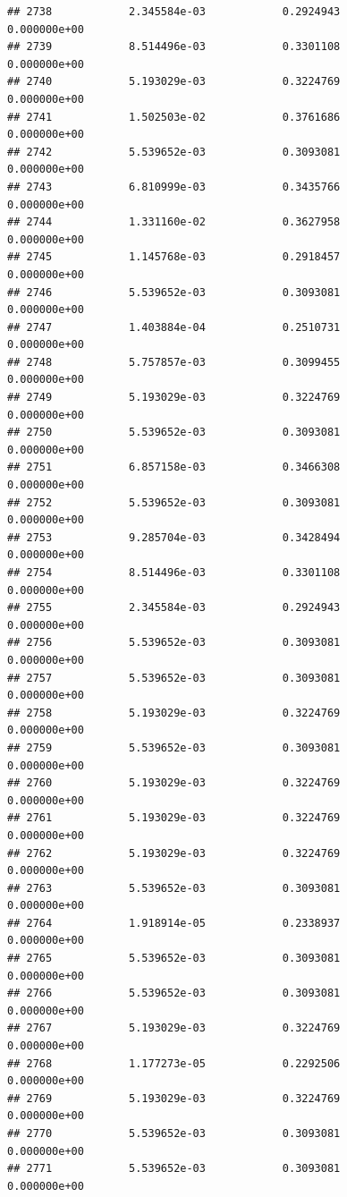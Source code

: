 \documentclass[
]{article}
\begin{document}
\begin{verbatim}
## 2738            2.345584e-03            0.2924943            0.000000e+00
## 2739            8.514496e-03            0.3301108            0.000000e+00
## 2740            5.193029e-03            0.3224769            0.000000e+00
## 2741            1.502503e-02            0.3761686            0.000000e+00
## 2742            5.539652e-03            0.3093081            0.000000e+00
## 2743            6.810999e-03            0.3435766            0.000000e+00
## 2744            1.331160e-02            0.3627958            0.000000e+00
## 2745            1.145768e-03            0.2918457            0.000000e+00
## 2746            5.539652e-03            0.3093081            0.000000e+00
## 2747            1.403884e-04            0.2510731            0.000000e+00
## 2748            5.757857e-03            0.3099455            0.000000e+00
## 2749            5.193029e-03            0.3224769            0.000000e+00
## 2750            5.539652e-03            0.3093081            0.000000e+00
## 2751            6.857158e-03            0.3466308            0.000000e+00
## 2752            5.539652e-03            0.3093081            0.000000e+00
## 2753            9.285704e-03            0.3428494            0.000000e+00
## 2754            8.514496e-03            0.3301108            0.000000e+00
## 2755            2.345584e-03            0.2924943            0.000000e+00
## 2756            5.539652e-03            0.3093081            0.000000e+00
## 2757            5.539652e-03            0.3093081            0.000000e+00
## 2758            5.193029e-03            0.3224769            0.000000e+00
## 2759            5.539652e-03            0.3093081            0.000000e+00
## 2760            5.193029e-03            0.3224769            0.000000e+00
## 2761            5.193029e-03            0.3224769            0.000000e+00
## 2762            5.193029e-03            0.3224769            0.000000e+00
## 2763            5.539652e-03            0.3093081            0.000000e+00
## 2764            1.918914e-05            0.2338937            0.000000e+00
## 2765            5.539652e-03            0.3093081            0.000000e+00
## 2766            5.539652e-03            0.3093081            0.000000e+00
## 2767            5.193029e-03            0.3224769            0.000000e+00
## 2768            1.177273e-05            0.2292506            0.000000e+00
## 2769            5.193029e-03            0.3224769            0.000000e+00
## 2770            5.539652e-03            0.3093081            0.000000e+00
## 2771            5.539652e-03            0.3093081            0.000000e+00

\end{verbatim}
\end{document}
